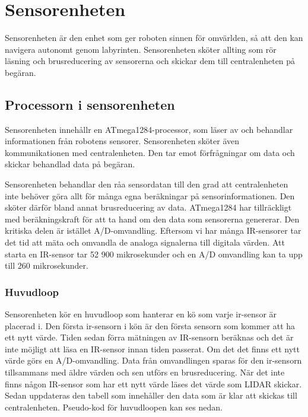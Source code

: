\documentclass[a4paper,titlepage,12pt]{article}
\begin{document}
	\section{Sensorenheten}
	Sensorenheten är den enhet som ger roboten sinnen för omvärlden, så att den
	kan navigera autonomt genom labyrinten. Sensorenheten sköter allting som
    rör läsning och brusreducering av sensorerna och skickar dem till
    centralenheten på begäran.

	\subsection{Processorn i sensorenheten}
	Sensorenheten innehållr en ATmega1284-processor, som läser av och 
	behandlar informationen från robotens sensorer. Sensorenheten sköter även
	kommunikationen med centralenheten. Den tar emot förfrågningar om data och
	skickar behandlad data på begäran.

	Sensorenheten behandlar den råa sensordatan till den grad att
	centralenheten inte behöver göra allt för många egna beräkningar på
	sensorinformationen. Den sköter därför bland annat brusreducering av
	data. ATmega1284 har tillräckligt med 
	beräkningskraft för att ta hand om den data som sensorerna genererar. Den kritiska 
	delen är istället A/D-omvandling. Eftersom vi har många IR-sensorer tar det tid att 
	mäta och omvandla de analoga signalerna till digitala värden. Att starta en IR-sensor 
	tar 52 900 mikrosekunder och en A/D omvandling kan ta upp till 260 mikrosekunder. 

    \subsubsection{Huvudloop}
    Sensorenheten kör en huvudloop som hanterar en kö som varje ir-sensor är placerad 
    i. Den första ir-sensorn i kön är den första sensorn som kommer att ha ett nytt 
    värde. Tiden sedan förra mätningen av IR-sensorn beräknas och det är inte 
    möjligt att läsa en IR-sensor innan tiden passerat. Om det det finns ett nytt värde 
    görs en A/D-omvandling. Data från omvandlingen sparas för den ir-sensorn 
    tillsammans med äldre värden och sen utförs en brusreducering. När det inte finns 
    någon IR-sensor som har ett nytt värde läses det värde som LIDAR skickar. Sedan 
    uppdateras den tabell som innehåller den data som är klar att skickas till 
    centralenheten. Pseudo-kod för huvudloopen kan ses nedan. 
    
\end{document}
